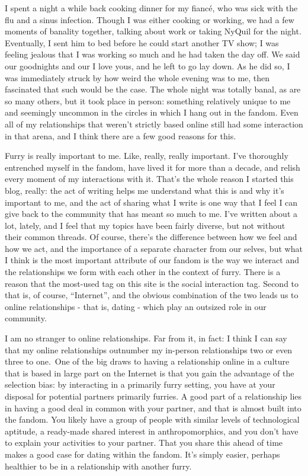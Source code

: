 I spent a night a while back cooking dinner for my fiancé, who was sick
with the flu and a sinus infection. Though I was either cooking or
working, we had a few moments of banality together, talking about work
or taking NyQuil for the night. Eventually, I sent him to bed before he
could start another TV show; I was feeling jealous that I was working so
much and he had taken the day off. We said our goodnights and our I love
yous, and he left to go lay down. As he did so, I was immediately struck
by how weird the whole evening was to me, then fascinated that such
would be the case. The whole night was totally banal, as are so many
others, but it took place in person: something relatively unique to me
and seemingly uncommon in the circles in which I hang out in the fandom.
Even all of my relationships that weren't strictly based online still
had some interaction in that arena, and I think there are a few good
reasons for this.

Furry is really important to me. Like, really, really important. I've
thoroughly entrenched myself in the fandom, have lived it for more than
a decade, and relish every moment of my interactions with it. That's the
whole reason I started this blog, really: the act of writing helps me
understand what this is and why it's important to me, and the act of
sharing what I write is one way that I feel I can give back to the
community that has meant so much to me. I've written about a lot,
lately, and I feel that my topics have been fairly diverse, but not
without their common threads. Of course, there's the difference between
how we feel and how we act, and the importance of a separate character
from our selves, but what I think is the most important attribute of our
fandom is the way we interact and the relationships we form with each
other in the context of furry. There is a reason that the most-used tag
on this site is the social interaction tag. Second to that is, of
course, ``Internet'', and the obvious combination of the two leads us to
online relationships - that is, dating - which play an outsized role in
our community.

I am no stranger to online relationships. Far from it, in fact: I think
I can say that my online relationships outnumber my in-person
relationships two or even three to one.~One of the big draws to having a
relationship online in a culture that is based in large part on the
Internet is that you gain the advantage of the selection bias: by
interacting in a primarily furry setting, you have at your disposal for
potential partners primarily furries. A good part of a relationship lies
in having a good deal in common with your partner, and that is almost
built into the fandom. You likely have a group of people with similar
levels of technological aptitude, a ready-made shared interest in
anthropomorphics, and you don't have to explain your activities to your
partner. That you share this ahead of time makes a good case for dating
within the fandom. It's simply easier, perhaps healthier to be in a
relationship with another furry.


